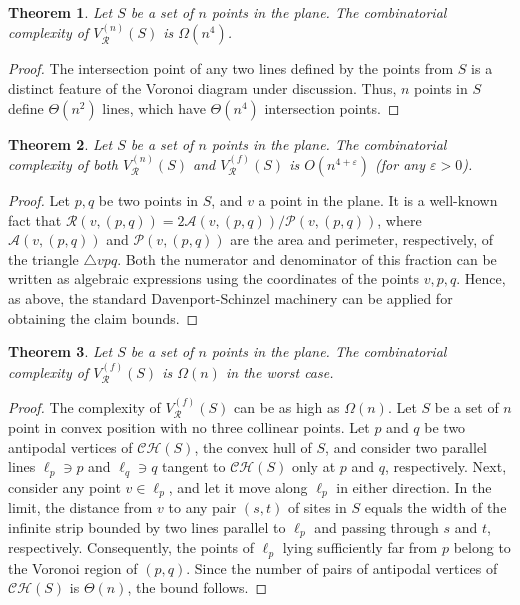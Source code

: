 \documentclass[10pt, conference, compsocconf]{IEEEtran}
\newtheorem{theorem}{Theorem}
\def\A{{\mathcal A}}
\def\R{{\mathcal R}}
\def\PP{{\mathcal P}}
\newcommand{\eps}{\varepsilon}
\begin{document}
\begin{theorem}
   \label{TH-lb-ins-rad-nn}
   Let $S$ be a set of $n$ points in the plane.
   The combinatorial complexity of $V_{\R}^{(n)}(S)$ is $\Omega(n^4)$.
\end{theorem}

\begin{proof}
   The intersection point of any two lines defined by the points from $S$
   is a distinct feature of the Voronoi diagram under discussion.
   Thus, $n$ points in $S$ define $\Theta(n^2)$ lines, which have
   $\Theta(n^4)$ intersection points.
\end{proof}

\begin{theorem}
   Let $S$ be a set of $n$ points in the plane.
   The combinatorial complexity of both $V_{\R}^{(n)}(S)$ and
   $V_{\R}^{(f)}(S)$ is $O(n^{4+\eps})$ (for any $\eps > 0$).
\end{theorem}

\begin{proof}
   Let $p,q$ be two points in $S$, and $v$ a point in the plane.
   It is a well-known fact that $\R(v,(p,q)) = 2\A(v,(p,q))/\PP(v,(p,q))$,
   where $\A(v,(p,q))$ and $\PP(v,(p,q))$ are the area and perimeter,
   respectively, of the triangle $\triangle vpq$.  Both the numerator and
   denominator of this fraction can be written as algebraic expressions
   using the coordinates of the points $v,p,q$.  Hence, as above, the
   standard Davenport-Schinzel machinery can be applied for obtaining the
   claim bounds.
\end{proof}

\begin{theorem}
   Let $S$ be a set of $n$ points in the plane.
   The combinatorial complexity of $V_\R^{(f)}(S)$ is $\Omega(n)$
   in the worst case.
\end{theorem}

\begin{proof}
   The complexity of $V_\R^{(f)}(S)$ can be as high as $\Omega(n)$.
Let $S$ be a set of $n$ point in convex position with no three
   collinear points.
   Let $p$ and $q$ be two antipodal vertices of $\mathcal{CH}(S)$, the
   convex hull of $S$, and consider two parallel lines $\ell_p \ni p$ and
   $\ell_q \ni q$ tangent to $\mathcal{CH}(S)$ only at $p$ and $q$,
   respectively.
   Next, consider any point $v \in \ell_p$, and let it move along $\ell_p$
   in either direction.  In the limit, the distance from $v$ to any pair
   $(s,t)$ of sites in $S$ equals the width of the infinite strip bounded
   by two lines parallel to $\ell_p$ and passing through $s$ and $t$,
   respectively.  Consequently, the points of $\ell_p$ lying sufficiently
   far from $p$ belong to the Voronoi region of $(p,q)$.
   Since the number of pairs of antipodal vertices of $\mathcal{CH}(S)$
   is $\Theta(n)$, the bound follows.
\end{proof}
\end{document}
